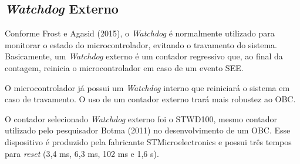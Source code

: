 \subsection{\textit{Watchdog} Externo}

Conforme  Frost e Agasid (2015), o \textit{Watchdog}  é normalmente utilizado para monitorar o estado do microcontrolador, evitando o travamento do sistema. Basicamente, um \textit{Watchdog} externo é um contador regressivo que, ao final da contagem, reinicia o microcontrolador em caso de um evento SEE. 

O microcontrolador já possui um \textit{Watchdog} interno que reiniciará o sistema em caso de travamento. O uso de um contador externo trará mais robustez ao OBC.

O contador selecionado \textit{Watchdog} externo foi o STWD100, mesmo contador utilizado pelo pesquisador Botma (2011) no desenvolvimento de um OBC. Esse dispositivo é produzido pela fabricante STMicroelectronics e possui três tempos para \textit{reset} (3,4 ms, 6,3 ms, 102 ms e 1,6 s).  

